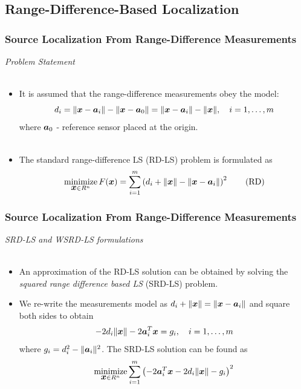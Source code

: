 \documentclass [t] {beamer} %
\begin{document}
\subsection{Range-Difference-Based Localization} %


\begin{frame} %
\frametitle{Source Localization From Range-Difference Measurements} %
{\large \textit{Problem Statement}}
\\~\\
\normalsize
\begin{itemize}
\item 
It is assumed that the range-difference measurements obey the model:
 \begin{equation} 
 \nonumber
 d_i=\|\mbox{\boldmath$x$}-\mbox{\boldmath$a$}_i\|-\|\mbox{\boldmath$x$}-\mbox{\boldmath$a$}_0\|=\|\mbox{\boldmath$x$}-\mbox{\boldmath$a$}_i\|-\|\mbox{\boldmath$x$}\|, \quad i = 1,\ldots,m
 \end{equation}
where $\mbox{\boldmath$a$}_0$ - reference sensor placed at the origin.\\~\\
 \item 
 The standard range-difference LS (RD-LS) problem is formulated as
 \begin{equation} \label{RD}
\mathop{\mbox{minimize}}_{\mbox{\boldmath$x$} \in R^n} F(\mbox{\boldmath$x$})=\sum_{i=1}^m \left(d_i+\|\mbox{\boldmath$x$}\|-\|\mbox{\boldmath$x$}-\mbox{\boldmath$a$}_i\|\right)^2 \tag{RD}
 \end{equation}
 \end{itemize}
\end{frame}



\begin{frame} %
\frametitle{Source Localization From Range-Difference Measurements} %
{\large \textit{SRD-LS and WSRD-LS formulations}}
\\~\\
\normalsize
\begin{itemize}
\item 
An approximation of the RD-LS solution can be obtained by solving the \textit{squared range difference based LS} (SRD-LS) problem. \\ %
\item 
We re-write the measurements model as $d_i+\|\mbox{\boldmath$x$}\|=\|\mbox{\boldmath$x$}-\mbox{\boldmath$a$}_i\|$ and square both sides to obtain%
  \begin{equation} 
  \nonumber
-2d_i\|\mbox{\boldmath$x$}\|-2\mbox{\boldmath$a$}_i^T\mbox{\boldmath$x$}=g_i, \quad i=1,\ldots,m
 \end{equation}
 where $g_i=d_i^2-\|\mbox{\boldmath$a$}_i\|^2$.  
The SRD-LS solution can be found as %
 \begin{equation}
 \nonumber
\mathop{\mbox{minimize}}_{{\mbox{\boldmath$x$}} \in R^{n}} \sum_{i=1}^m \left(-2\mbox{\boldmath$a$}_i^T\mbox{\boldmath$x$}-2d_i\|\mbox{\boldmath$x$}\|-g_i\right)^2 
\end{equation}

 \end{itemize}
\end{frame}
\end{document}
